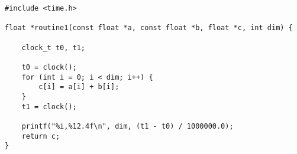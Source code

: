 \begin{code}
    \begin{verbatim}
#include <time.h>

float *routine1(const float *a, const float *b, float *c, int dim) {

    clock_t t0, t1;

    t0 = clock();
    for (int i = 0; i < dim; i++) {
        c[i] = a[i] + b[i];
    }
    t1 = clock();

    printf("%i,%12.4f\n", dim, (t1 - t0) / 1000000.0);
    return c;
}
    \end{verbatim}
\end{code}
